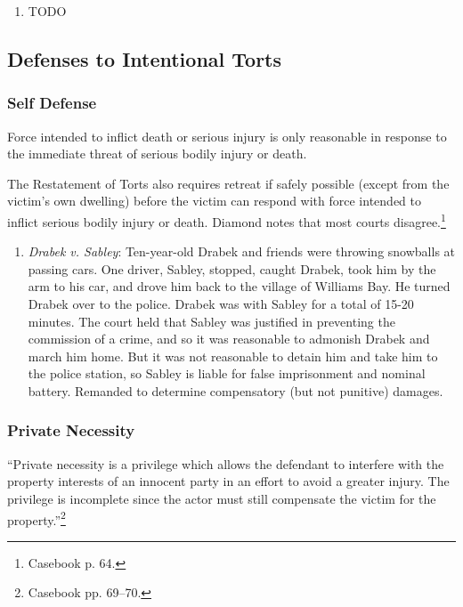 \begin{enumerate}
    \item TODO
\end{enumerate}

\subsection{Defenses to Intentional Torts}

\subsubsection{Self Defense}

Force intended to inflict death or serious injury is only reasonable in response to the immediate threat of serious bodily injury or death.

The Restatement of Torts also requires retreat if safely possible (except from the victim's own dwelling) before the victim can respond with force intended to inflict serious bodily injury or death. Diamond notes that most courts disagree.\footnote{Casebook p. 64.}

\begin{enumerate}
    \item \emph{Drabek v. Sabley}: Ten-year-old Drabek and friends were throwing snowballs at passing cars. One driver, Sabley, stopped, caught Drabek, took him by the arm to his car, and drove him back to the village of Williams Bay. He turned Drabek over to the police. Drabek was with Sabley for a total of 15-20 minutes. The court held that Sabley was justified in preventing the commission of a crime, and so it was reasonable to admonish Drabek and march him home. But it was not reasonable to detain him and take him to the police station, so Sabley is liable for false imprisonment and nominal battery. Remanded to determine compensatory (but not punitive) damages.
\end{enumerate}

\subsubsection{Private Necessity}

``Private necessity is a privilege which allows the defendant to interfere with the property interests of an innocent party in an effort to avoid a greater injury. The privilege is incomplete since the actor must still compensate the victim for the property.''\footnote{Casebook pp. 69--70.}

